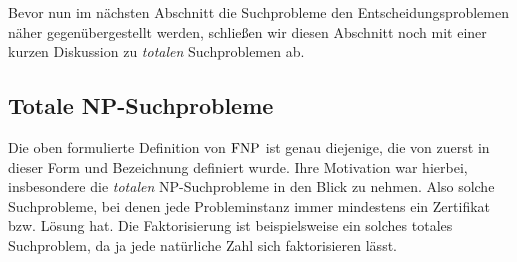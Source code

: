 Bevor nun im nächsten Abschnitt die Suchprobleme den Entscheidungsproblemen näher gegenübergestellt werden, schließen wir diesen Abschnitt noch mit einer kurzen Diskussion zu \emph{totalen} Suchproblemen ab.

\subsection*{Totale NP-Suchprobleme}

Die oben formulierte Definition von $\mathrm{FNP}$ ist genau diejenige, die von \textcite{megiddo_total_1991} zuerst in dieser Form und Bezeichnung definiert wurde. Ihre Motivation war hierbei, insbesondere die \emph{totalen} NP-Suchprobleme in den Blick zu nehmen. Also solche Suchprobleme, bei denen jede Probleminstanz immer mindestens ein Zertifikat bzw. Lösung hat. Die Faktorisierung ist beispielsweise ein solches totales Suchproblem, da ja jede natürliche Zahl sich faktorisieren lässt.


